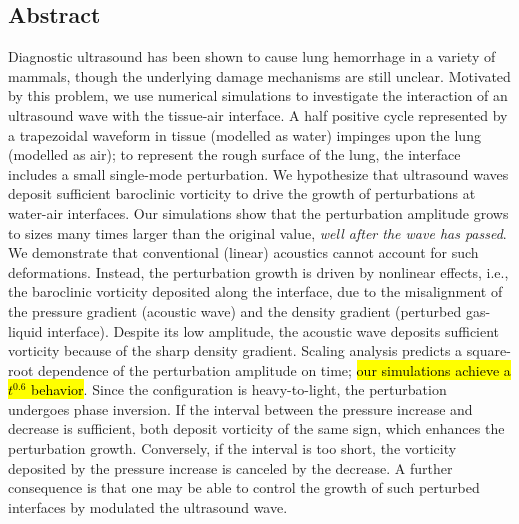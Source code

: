 \begin{center}
  \begin{minipage}{0.8\textwidth}
    \subsection*{Abstract}
    Diagnostic ultrasound has been shown to cause lung hemorrhage in a
    variety of mammals, though the underlying damage mechanisms are
    still unclear. Motivated by this problem, we use numerical
    simulations to investigate the interaction of an ultrasound wave
    with the tissue-air interface. A half positive cycle represented
    by a trapezoidal waveform in tissue (modelled as water) impinges
    upon the lung (modelled as air); to represent the rough surface of
    the lung, the interface includes a small single-mode
    perturbation. We hypothesize that ultrasound waves deposit
    sufficient baroclinic vorticity to drive the growth of
    perturbations at water-air interfaces. Our simulations show that
    the perturbation amplitude grows to sizes many times larger than
    the original value, \emph{well after the wave has passed}. We
    demonstrate that conventional (linear) acoustics cannot account
    for such deformations. Instead, the perturbation growth is driven
    by nonlinear effects, i.e., the baroclinic vorticity deposited
    along the interface, due to the misalignment of the pressure
    gradient (acoustic wave) and the density gradient (perturbed
    gas-liquid interface). Despite its low amplitude, the acoustic
    wave deposits sufficient vorticity because of the sharp density
    gradient. Scaling analysis predicts a square-root dependence of
    the perturbation amplitude on time; \hl{our simulations achieve a
      $t^{0.6}$ behavior}. Since the configuration is heavy-to-light,
    the perturbation undergoes phase inversion. If the interval
    between the pressure increase and decrease is sufficient, both
    deposit vorticity of the same sign, which enhances the
    perturbation growth. Conversely, if the interval is too short, the
    vorticity deposited by the pressure increase is canceled by the
    decrease. A further consequence is that one may be able to control
    the growth of such perturbed interfaces by modulated the
    ultrasound wave.
  \end{minipage}
\end{center}
%
%
